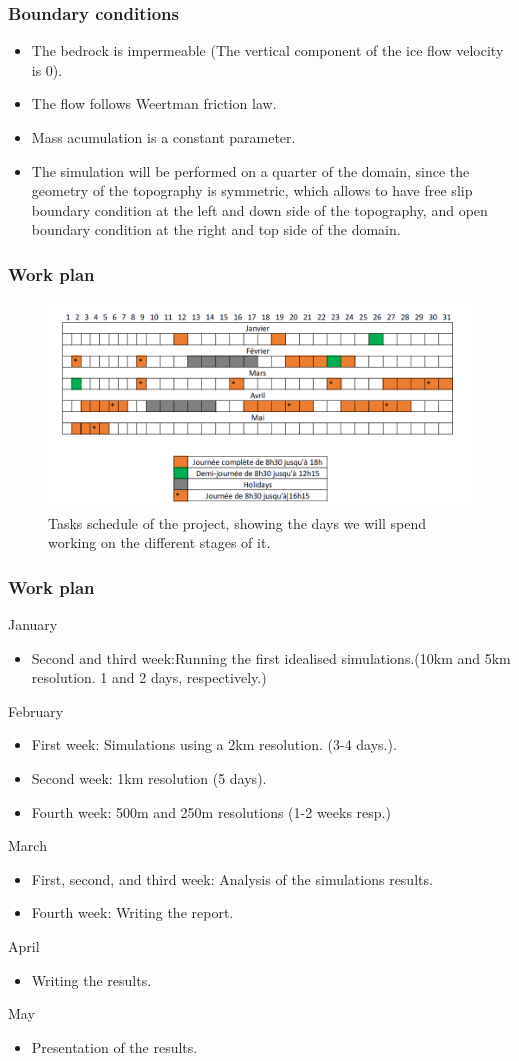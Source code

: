 \documentclass[11pt]{beamer}
\begin{document}
\begin{frame}
	\frametitle{Boundary conditions}
	\begin{itemize}
		\item The bedrock is impermeable (The vertical component of the ice flow velocity is 0). 
		\item The flow follows Weertman friction law.
		\item Mass acumulation is a constant parameter.
		\item The simulation will be performed on a quarter of the domain, since the geometry of the topography is symmetric, which allows to have free slip boundary condition at the left and down side of the topography, and open boundary condition at the right and top side of the domain. 
	\end{itemize}
\end{frame}
\begin{frame}
	\frametitle{Work plan}
	\begin{figure}[!h]
		\centering
		\includegraphics[width=0.7\linewidth]{../fig/Schedule}
		\caption{Tasks schedule of the project, showing the days we will spend working on the different stages of it.}
		\label{Schedule}
	\end{figure}
\end{frame}
\begin{frame}
	\frametitle{Work plan}
January
\begin{itemize}
	\item Second and third week:Running the first idealised simulations.(10km and 5km resolution. 1 and 2 days, respectively.)
\end{itemize}
February
\begin{itemize}
	\item First week: Simulations using a 2km resolution.  (3-4 days.).
	\item Second week: 1km resolution (5 days).
	\item Fourth week: 500m and 250m resolutions (1-2 weeks resp.)
\end{itemize}
March
\begin{itemize}
	\item First, second, and third week: Analysis of the simulations results.
	\item Fourth week: Writing the report.
\end{itemize}
April
\begin{itemize}
	\item  Writing the results.
\end{itemize}
May
\begin{itemize}
	\item Presentation of the results.
\end{itemize}
\end{frame}
\end{document}
